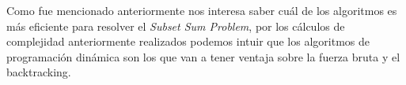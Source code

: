 \documentclass[a4paper]{article}
\begin{document}
Como fue mencionado anteriormente nos interesa saber cuál de los algoritmos es más eficiente para resolver el \textit{Subset Sum Problem}, por los cálculos de complejidad anteriormente realizados podemos intuir que los algoritmos de programación dinámica son los que van a tener ventaja sobre la fuerza bruta y el backtracking.
\\
%
\end{document}
